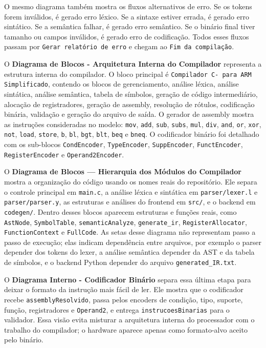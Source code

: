 \documentclass[12pt,a4paper]{article}
\begin{document}
O mesmo diagrama também mostra os fluxos alternativos de erro. Se os tokens forem inválidos, é gerado erro léxico. Se a sintaxe estiver errada, é gerado erro sintático. Se a semântica falhar, é gerado erro semântico. Se o binário final tiver tamanho ou campos inválidos, é gerado erro de codificação. Todos esses fluxos passam por \texttt{Gerar relatório de erro} e chegam ao \texttt{Fim da compilação}.

O \textbf{Diagrama de Blocos - Arquitetura Interna do Compilador} representa a estrutura interna do compilador. O bloco principal é \texttt{Compilador C- para ARM Simplificado}, contendo os blocos de gerenciamento, análise léxica, análise sintática, análise semântica, tabela de símbolos, geração de código intermediário, alocação de registradores, geração de assembly, resolução de rótulos, codificação binária, validação e geração do arquivo de saída. O gerador de assembly mostra as instruções consideradas no modelo: \texttt{mov}, \texttt{add}, \texttt{sub}, \texttt{subs}, \texttt{mul}, \texttt{div}, \texttt{and}, \texttt{or}, \texttt{xor}, \texttt{not}, \texttt{load}, \texttt{store}, \texttt{b}, \texttt{bl}, \texttt{bgt}, \texttt{blt}, \texttt{beq} e \texttt{bneq}. O codificador binário foi detalhado com os sub-blocos \texttt{CondEncoder}, \texttt{TypeEncoder}, \texttt{SuppEncoder}, \texttt{FunctEncoder}, \texttt{RegisterEncoder} e \texttt{Operand2Encoder}.

O \textbf{Diagrama de Blocos — Hierarquia dos Módulos do Compilador} mostra a organização do código usando os nomes reais do repositório. Ele separa o controle principal em \texttt{main.c}, a análise léxica e sintática em \texttt{parser/lexer.l} e \texttt{parser/parser.y}, as estruturas e análises do frontend em \texttt{src/}, e o backend em \texttt{codegen/}. Dentro desses blocos aparecem estruturas e funções reais, como \texttt{AstNode}, \texttt{SymbolTable}, \texttt{semanticAnalyze}, \texttt{generate\_ir}, \texttt{RegisterAllocator}, \texttt{FunctionContext} e \texttt{FullCode}. As setas desse diagrama não representam passo a passo de execução; elas indicam dependência entre arquivos, por exemplo o parser depender dos tokens do lexer, a análise semântica depender da AST e da tabela de símbolos, e o backend Python depender do arquivo \texttt{generated\_IR.txt}.

O \textbf{Diagrama Interno - Codificador Binário} separa essa última etapa para deixar o formato da instrução mais fácil de ler. Ele mostra que o codificador recebe \texttt{assemblyResolvido}, passa pelos encoders de condição, tipo, suporte, função, registradores e \texttt{Operand2}, e entrega \texttt{instrucoesBinarias} para o validador. Essa visão evita misturar a arquitetura interna do processador com o trabalho do compilador; o hardware aparece apenas como formato-alvo aceito pelo binário.
\end{document}
